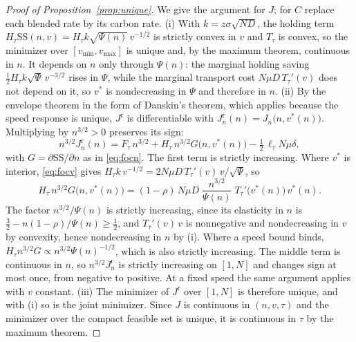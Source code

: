 \documentclass[11pt]{article}
\theoremstyle{definition}
\theoremstyle{remark}
\theoremstyle{plain}
\newcommand{\sstock}{\mathrm{SS}}
\begin{document}
\begin{proof}[Proof of Proposition~\ref{prop:unique}]
We give the argument for $J$; for $C$ replace each blended rate by its carbon rate. (i) With
$k=z\sigma\sqrt{ND}$, the holding term $H_\tau\sstock(n,v)=H_\tau k\sqrt{\Psi(n)}\,v^{-1/2}$ is strictly
convex in $v$ and $T_\tau$ is convex, so the minimizer over $[v_{\min},v_{\max}]$ is unique and, by the
maximum theorem, continuous in $n$. It depends on $n$ only through $\Psi(n)$: the marginal holding saving
$\tfrac12H_\tau k\sqrt{\Psi}\,v^{-3/2}$ rises in $\Psi$, while the marginal transport cost $N\mu D\,T_\tau'(v)$
does not depend on it, so $v^*$ is nondecreasing in $\Psi$ and therefore in $n$.
(ii) By the envelope theorem in the form of Danskin's theorem, which applies because the speed response is
unique, $J^{\mathrm r}$ is differentiable with $J^{\mathrm r}_n(n)=J_n\big(n,v^*(n)\big)$.
Multiplying by $n^{3/2}>0$ preserves its sign:
\[
  n^{3/2}J^{\mathrm r}_n(n)=F_\tau\,n^{3/2}+H_\tau\,n^{3/2}G\big(n,v^*(n)\big)-\tfrac12\,\ell_\tau N\mu\delta ,
\]
with $G=\partial\sstock/\partial n$ as in \eqref{eq:focn}. The first term is strictly
increasing. Where $v^*$ is interior, \eqref{eq:focv} gives $H_\tau k\,v^{-1/2}=2N\mu D\,T_\tau'(v)\,v/\sqrt{\Psi}$, so
\[
  H_\tau\,n^{3/2}G\big(n,v^*(n)\big)=(1-\rho)\,N\mu D\;\frac{n^{3/2}}{\Psi(n)}\;T_\tau'\big(v^*(n)\big)\,v^*(n).
\]
The factor $n^{3/2}/\Psi(n)$ is strictly increasing, since its elasticity in $n$ is
$\tfrac32-n(1-\rho)/\Psi(n)\ge\tfrac12$, and $T_\tau'(v)\,v$ is nonnegative and nondecreasing in $v$ by
convexity, hence nondecreasing in $n$ by (i). Where a speed bound binds,
$H_\tau n^{3/2}G\propto n^{3/2}\Psi(n)^{-1/2}$, which is also strictly increasing. The middle term is
continuous in $n$, so $n^{3/2}J^{\mathrm r}_n$ is strictly increasing on $[1,N]$ and changes sign at most once,
from negative to positive. At a fixed speed the same argument applies with $v$ constant.
(iii) The minimizer of $J^{\mathrm r}$ over $[1,N]$ is therefore unique, and with (i) so is the joint
minimizer. Since $J$ is continuous in $(n,v,\tau)$ and the minimizer over the compact feasible set is unique,
it is continuous in $\tau$ by the maximum theorem.
\end{proof}
\end{document}
